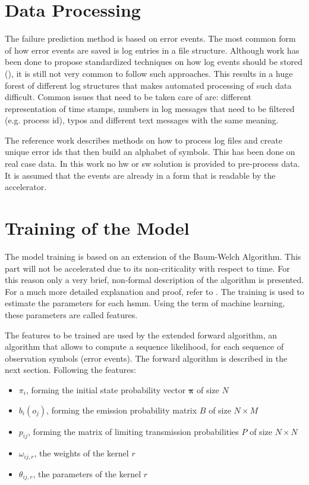 \documentclass[mscthesis]{usiinfthesis}
\begin{document}
\section{Data Processing}
\label{ch:event_data}

The failure prediction method is based on error events. The most common form of
how error events are saved is log entries in a file structure. Although work
has been done to propose standardized techniques on how log events should be
stored (\cite{IPDPS04_Salfner, DSN09_Ziming}), it is still not very common to
follow such approaches. This results in a huge forest of different log
structures that makes automated processing of such data difficult. Common
issues that need to be taken care of are: different representation of time
stamps, numbers in log messages that need to be filtered (e.g. process id),
typos and different text messages with the same meaning.

The reference work \cite{salfner08} describes methods on how to process log
files and create unique error ids that then build an alphabet of symbols. This
has been done on real case data. In this work no \gls{hw} or \gls{sw} solution
is provided to pre-process data. It is assumed that the events are already in
a form that is readable by the accelerator.

\section{Training of the Model}
\label{ch:event_train}

The model training is based on an extension of the Baum-Welch Algorithm. This
part will not be accelerated due to its non-criticality with respect to time.
For this reason only a very brief, non-formal description of the algorithm is
presented. For a much more detailed explanation and proof, refer to
\cite{salfner08}. The training is used to estimate the parameters for each
\gls{hsmm}. Using the term of machine learning, these parameters are called
features.

The features to be trained are used by the extended forward algorithm, an
algorithm that allows to compute a sequence likelihood, for each sequence of
observation symbols (error events). The forward algorithm is described in
the next section. Following the features:
\begin{itemize}
    \item $ \pi_i $, forming the initial state probability vector
        $ \boldsymbol{\pi} $ of size $ N $
    \item $ b_i(o_j) $, forming the emission probability matrix $ B $ of size
        $ N \times M $
    \item $ p_{ij} $, forming the matrix of limiting transmission probabilities
        $ P $ of size $ N \times N $
    \item $ \omega_{ij, r} $, the weights of the kernel $ r $
    \item $ \theta_{ij, r} $, the parameters of the kernel $ r $
\end{itemize}
\end{document}
